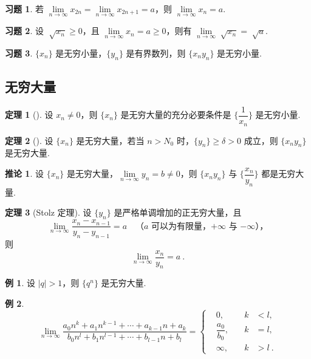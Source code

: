 \documentclass[zihao=-4,linespread=1.8,UTF8,nothm]{aytony_base}
\theoremstyle{definition}
\newtheorem{theorem}{\indent\heiti\textbf{定理}}[subsection]
\newtheorem*{corollary}{\indent\heiti\textbf{推论}}
\newtheorem{example}{\indent\heiti\textbf{例}}[subsection]
\newtheorem{exercise}{\indent\heiti\textbf{习题}}[subsection]
\begin{document}
\setcounter{exercise}{4}
\begin{exercise}
    若 $\lim\limits_{n \to \infty} x_{2n} = \lim\limits_{n \to \infty} x_{2n+1} = a$，则 $\lim\limits_{n \to \infty} x_n = a$.
\end{exercise}

\begin{exercise}
    设 $\sqrt[]{x_n} \geqslant 0$，且 $\lim\limits_{n \to \infty} x_n = a \geqslant 0$，则有 $\lim\limits_{n \to \infty} \sqrt[]{x_n} = \sqrt[]{a}$.
\end{exercise}

\begin{exercise}
    $\{x_n\}$ 是无穷小量，$\{y_n\}$ 是有界数列，则 $\{x_ny_n\}$ 是无穷小量.
\end{exercise}

\subsection{无穷大量}

\begin{theorem}[]
    设 $x_n \neq 0$，则 $\{x_n\}$ 是无穷大量的充分必要条件是 $\{\dfrac{1}{x_n}\}$ 是无穷小量.
\end{theorem}

\begin{theorem}[]
    设 $\{x_n\}$ 是无穷大量，若当 $n> N_0$ 时，$\{y_n\}\geqslant \delta > 0$ 成立，则 $\{x_ny_n\}$ 是无穷大量.
\end{theorem}

\begin{corollary}
    设 $\{x_n\}$ 是无穷大量，$\lim\limits_{n \to \infty} y_n = b \neq 0$，则 $\{x_ny_n\}$ 与 $\{\dfrac{x_n}{y_n}\}$ 都是无穷大量.
\end{corollary}

\begin{theorem}[Stolz 定理]
    设 $\{y_n\}$ 是严格单调增加的正无穷大量，且 $$
        \lim\limits_{n \to \infty} \dfrac{x_n - x_{n-1}}{y_n - y_{n-1}} = a\quad \text{（$a$ 可以为有限量，$+\infty$ 与 $-\infty$），}
    $$ 则 $$
        \lim\limits_{n \to \infty} \dfrac{x_n}{y_n} = a\ .
    $$
\end{theorem}

\begin{example}
    设 $|q| > 1$，则 $\{q^n\}$ 是无穷大量.
\end{example}

\setcounter{example}{2}
\begin{example}
    $$
        \lim\limits_{n \to \infty} \dfrac{a_0n^k + a_1n^{k-1} + \cdots + a_{k-1}n + a_k}{b_0n^l + b_1n^{l-1} + \cdots + b_{l-1}n + b_l} = \left\{
        \begin{aligned}
             & 0, \quad                & k & < l,   \\
             & \dfrac{a_0}{b_0}, \quad & k & =l,    \\
             & \infty, \quad           & k & > l\ .
        \end{aligned}
        \right.
    $$
\end{example}
\end{document}
